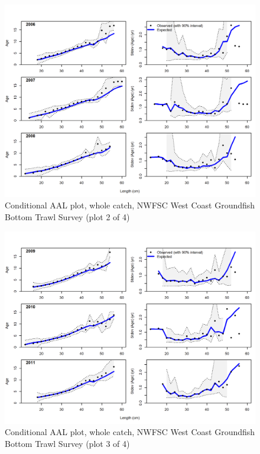 \documentclass[12pt,]{article}
\begin{document}
\begin{figure}
\centering
\includegraphics{r4ss/plots_mod1/comp_condAALfit_Andre_plotsflt7mkt0_page2.png}
\caption{Conditional AAL plot, whole catch, NWFSC West Coast Groundfish
Bottom Trawl Survey (plot 2 of 4) \label{fig:nwfsc_combo_andre_2}}
\end{figure}

\begin{figure}
\centering
\includegraphics{r4ss/plots_mod1/comp_condAALfit_Andre_plotsflt7mkt0_page3.png}
\caption{Conditional AAL plot, whole catch, NWFSC West Coast Groundfish
Bottom Trawl Survey (plot 3 of 4) \label{fig:nwfsc_combo_andre_3}}
\end{figure}
\end{document}
